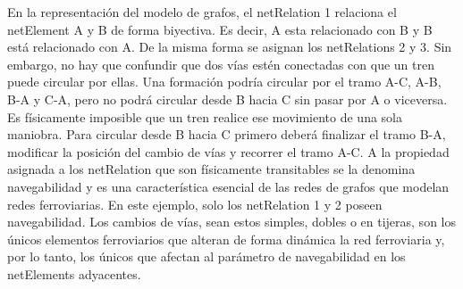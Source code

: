     En la representación del modelo de grafos, el netRelation 1 relaciona el netElement A y B de forma biyectiva. Es decir, A esta relacionado con B y B está relacionado con A. De la misma forma se asignan los netRelations 2 y 3. Sin embargo, no hay que confundir que dos vías estén conectadas con que un tren puede circular por ellas. Una formación podría circular por el tramo A-C, A-B, B-A y C-A, pero no podrá circular desde B hacia C sin pasar por A o viceversa. Es físicamente imposible que un tren realice ese movimiento de una sola maniobra. Para circular desde B hacia C primero deberá finalizar el tramo B-A, modificar la posición del cambio de vías y recorrer el tramo A-C. A la propiedad asignada a los netRelation que son físicamente transitables se la denomina navegabilidad y es una característica esencial de las redes de grafos que modelan redes ferroviarias. En este ejemplo, solo los netRelation 1 y 2 poseen navegabilidad. Los cambios de vías, sean estos simples, dobles o en tijeras, son los únicos elementos ferroviarios que alteran de forma dinámica la red ferroviaria y, por lo tanto, los únicos que afectan al parámetro de navegabilidad en los netElements adyacentes.
    
    